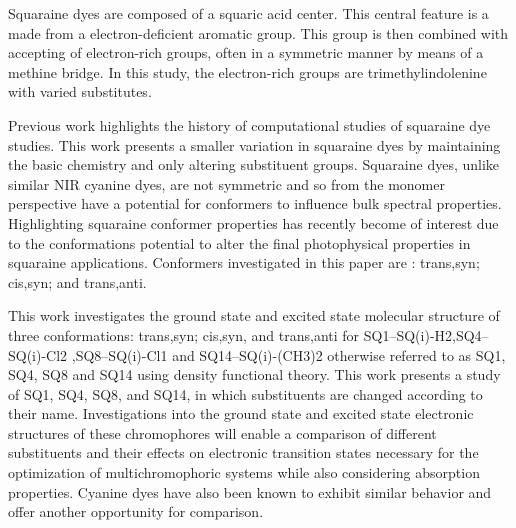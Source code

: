 \documentclass[journal=jacsat,manuscript=article]{achemso}
\begin{document}
Squaraine dyes are composed of a squaric acid center. This central feature is a made from a electron-deficient aromatic group. This group is then combined with accepting of electron-rich groups, often in a symmetric manner by means of a methine bridge\cite{Ilina2020SquaraineChallenges}⁠. In this study, the electron-rich groups are trimethylindolenine with varied substitutes.

Previous work\cite{Bassal2017ExploringADC2}⁠ highlights the history of computational studies of squaraine dye studies. This work presents a smaller variation in squaraine dyes by maintaining the basic chemistry and only altering substituent groups. Squaraine dyes, unlike similar NIR cyanine dyes, are not symmetric and so from the monomer perspective have a potential for conformers to influence bulk spectral properties\cite{Kolosova2018MolecularSquaraines}⁠. Highlighting squaraine conformer properties has recently become of interest due to the conformations potential to alter the final photophysical properties in squaraine applications\cite{Paterno2018ExcitedScenario}⁠.  Conformers investigated in this paper are : trans,syn; cis,syn; and trans,anti.

This work investigates the ground state and excited state molecular structure of three conformations: trans,syn; cis,syn, and trans,anti for SQ1--SQ(i)-H2,SQ4--SQ(i)-Cl2 ,SQ8--SQ(i)-Cl1 and SQ14--SQ(i)-(CH3)2 otherwise referred to as SQ1, SQ4, SQ8 and SQ14 using density functional theory. This work presents a study of SQ1, SQ4, SQ8, and SQ14, in which substituents are changed according to their name. Investigations into the ground state and excited state electronic structures of these chromophores will enable a comparison of different substituents and their effects on electronic transition states necessary for the optimization of multichromophoric systems while also considering absorption properties. Cyanine dyes have also been known to exhibit similar behavior and offer another opportunity for comparison\cite{Fothergill2018AbDyes}.


\end{document}
